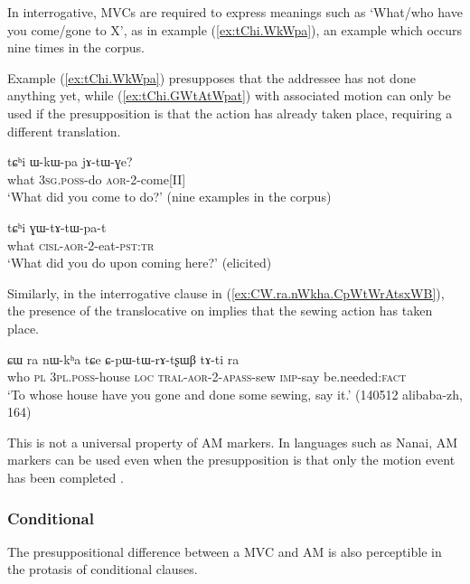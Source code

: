 In interrogative, MVCs are required to express meanings such as `What/who have you come/gone to X', as in example (\ref{ex:tChi.WkWpa}), an example which occurs nine times in the corpus.

Example (\ref{ex:tChi.WkWpa}) presupposes that the addressee has not done anything yet, while (\ref{ex:tChi.GWtAtWpat}) with associated motion can only be used if the presupposition is that the action has already taken place, requiring a different translation.

\begin{exe}
	\ex \label{ex:tChi.WkWpa}
	\gll tɕʰi ɯ-kɯ-pa jɤ-tɯ-ɣe? \\
	what \textsc{3sg}.\textsc{poss}-do \textsc{aor}-2-come[II] \\
	\glt `What did you come to do?' (nine examples in the corpus)
\end{exe}

\begin{exe}
\ex \label{ex:tChi.GWtAtWpat}
\gll tɕʰi ɣɯ-tɤ-tɯ-pa-t \\
what \textsc{cisl}-\textsc{aor}-2-eat-\textsc{pst}:\textsc{tr}    \\
\glt `What did you do upon coming here?' (elicited)
\end{exe}

Similarly, in the interrogative clause in (\ref{ex:CW.ra.nWkha.CpWtWrAtsxWB}), the presence of the translocative on  implies that the sewing action has taken place.

\begin{exe}
\ex \label{ex:CW.ra.nWkha.CpWtWrAtsxWB}
\gll ɕɯ ra nɯ-kʰa tɕe ɕ-pɯ-tɯ-rɤ-tʂɯβ tɤ-ti ra \\
who \textsc{pl} \textsc{3pl}.\textsc{poss}-house \textsc{loc} \textsc{tral}-\textsc{aor}-2-\textsc{apass}-sew \textsc{imp}-say be.needed:\textsc{fact} \\
\glt `To whose house have you gone and done some sewing, say it.' (140512 alibaba-zh, 164)
\end{exe}

This is not a universal property of AM markers. In languages such as Nanai, AM markers can be used even when the presupposition is that only the motion event has been completed \citep{stojnova16nda}.

\subsubsection{Conditional} \label{sec:am.conditional}
The presuppositional difference between a MVC and AM is also perceptible in the protasis of conditional clauses. 

